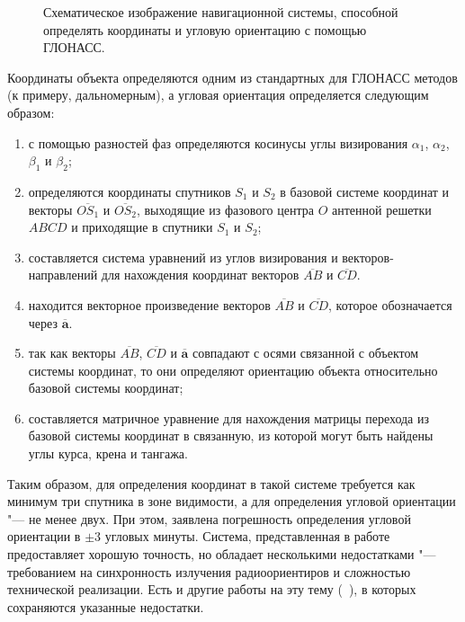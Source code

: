 \documentclass[../main.tex]{subfiles}
\begin{document}
\begin{figure}[tb]
    \begin{center}


    \caption{Схематическое изображение навигационной системы, способной определять координаты и угловую ориентацию с помощью ГЛОНАСС.}
    \label{fig:glonass:pic2}
    \end{center}
\end{figure}

Координаты объекта определяются одним из стандартных для ГЛОНАСС методов (к примеру, дальномерным), а угловая ориентация определяется следующим образом:
\begin{enumerate}
    \item с помощью разностей фаз определяются косинусы углы визирования $\alpha_1$, $\alpha_2$, $\beta_1$ и $\beta_2$;
    \item определяются координаты спутников $S_1$ и $S_2$ в базовой системе координат и векторы $\overline{OS_1}$ и $\overline{OS_2}$, выходящие из фазового центра $O$ антенной решетки $ABCD$ и приходящие в спутники $S_1$ и $S_2$;
    \item составляется система уравнений из углов визирования и векторов-направлений для нахождения координат векторов $\overline{AB}$ и $\overline{CD}$.
    \item находится векторное произведение векторов $\overline{AB}$ и $\overline{CD}$, которое обозначается через $\overline{\mathbf{a}}$.
    \item так как векторы  $\overline{AB}$, $\overline{CD}$ и $\overline{\mathbf{a}}$ совпадают с осями связанной с объектом системы координат, то они определяют ориентацию объекта относительно базовой системы координат;
    \item составляется матричное уравнение для нахождения матрицы перехода из базовой системы координат в связанную, из которой могут быть найдены углы курса, крена и тангажа.
\end{enumerate}
Таким образом, для определения координат в такой системе требуется как минимум три спутника в зоне видимости, а для определения угловой ориентации "--- не менее двух. При этом, заявлена погрешность определения угловой ориентации в $\pm 3$ угловых минуты. Система, представленная в работе~\cite{STEPANOV:2006} предоставляет хорошую точность, но обладает несколькими недостатками "--- требованием на синхронность излучения радиоориентиров и сложностью технической реализации. Есть и другие работы на эту тему (~\cite{KORNEV:2016}), в которых сохраняются указанные недостатки.
\end{document}
